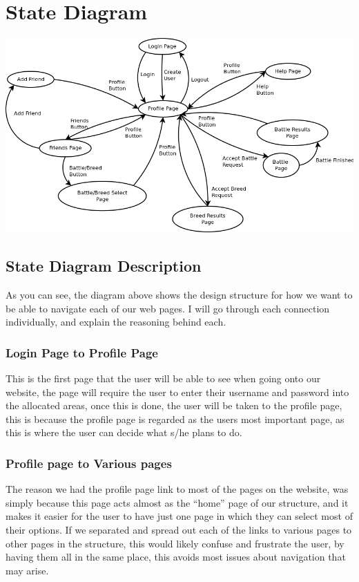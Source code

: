 \documentclass{project}
\begin{document}
\section{State Diagram}
\begin{center}
\includegraphics[scale=0.50]{state_diagram.png}
\end{center}

\subsection{State Diagram Description}

As you can see, the diagram above shows the design structure for how we want to be able to navigate each of our web pages. I will go through each connection individually, and explain the reasoning behind each.

\subsubsection{Login Page to Profile Page}

This is the first page that the user will be able to see when going onto our website, the page will require the user to enter their username and password into the allocated areas, once this is done, the user will be taken to the profile page, this is because the profile page is regarded as the users most important page, as this is where the user can decide what s/he plans to do.

\subsubsection{Profile page to Various pages}

The reason we had the profile page link to most of the pages on the website, was simply because this page acts almost as the “home” page of our structure, and it makes it easier for the user to have just one page in which they can select most of their options. If we separated and spread out each of the links to various pages to other pages in the structure, this would likely confuse and frustrate the user, by having them all in the same place, this avoids most issues about navigation that may arise.
\end{document}
